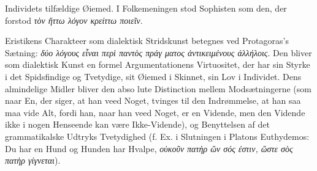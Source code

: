 \documentclass[12pt,a4paper]{book}
\newcommand{\gk}[1]{\textit{#1}}
\begin{document}
Individets tilfældige Øiemed. I Folkemeningen stod Sophisten
som den, der forstod \gk{τὸν ἥττω λόγον κρείττω ποιεῖν}.

Eristikens Charakteer som dialektisk Stridskunst betegnes
ved Protagoras's Sætning: \gk{δύο λόγους εἶναι περὶ παντὸς πράγ\-%
ματος ἀντικειμένους ἀλλήλοις}. Den bliver som dialektisk
Kunst en formel Argumentationens Virtuositet, der har sin
Styrke i det Spidsfindige og Tvetydige, sit Øiemed i Skinnet,
sin Lov i Individet. Dens almindelige Midler bliver den abso\-%
lute Distinction mellem Modsætningerne (som naar En, der
siger, at han veed Noget, tvinges til den Indrømmelse, at han
saa maa vide Alt, fordi han, naar han veed Noget, er en
Vidende, men den Vidende ikke i nogen Henseende kan være
Ikke-Vidende), og Benyttelsen af det grammatikalske Udtryks
Tvetydighed (f. Ex. i Slutningen i Platons Euthydemos: Du har
en Hund og Hunden har Hvalpe, \gk{οὐκοῦν πατὴρ ὢν σός ἐστιν,
ὥστε σὸς πατὴρ γίγνεται}).
\end{document}
